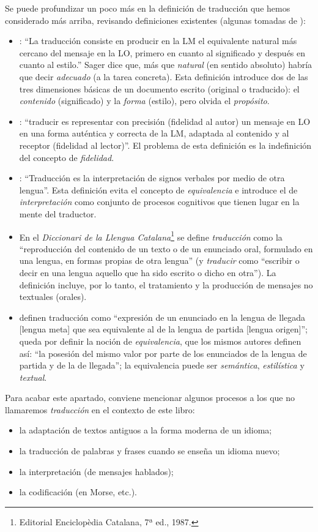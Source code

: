 Se puede profundizar un poco más en la definición de traducción que hemos considerado más arriba, revisando definiciones existentes (algunas tomadas de \citealt{sager93b}): \begin{itemize} \item \citet[p.~19]{nida59b}: ``La traducción consiste en producir en la LM el equivalente natural más cercano del mensaje en la LO, primero en cuanto al significado y después en cuanto al estilo.'' Sager dice que, más que \emph{natural} (en sentido absoluto) habría que decir \emph{adecuado} (a la tarea concreta). Esta definición introduce dos de las tres dimensiones básicas de un documento escrito (original o traducido): el \emph{contenido} (significado) y la \emph{forma} (estilo), pero olvida el \emph{propósito}. \item \citet{flamand83b}: ``traducir es representar con precisión (fidelidad al autor) un mensaje en LO en una forma auténtica y correcta de la LM, adaptada al contenido y al receptor (fidelidad al lector)''. El problema de esta definición es la indefinición del concepto de \emph{fidelidad}. \item \citet{jakobson66b}: ``Traducción es la interpretación de signos verbales por medio de otra lengua''. Esta definición evita el concepto de \emph{equivalencia} e introduce el de \emph{interpretación} como conjunto de procesos cognitivos que tienen lugar en la mente del traductor. \item En el \emph{Diccionari de la Llengua Catalana}\footnote{Editorial Enciclopèdia Catalana, 7ª ed., 1987.} se define {\em traducción} como la ``reproducción del contenido de un texto o de un enunciado oral, formulado en una lengua, en formas propias de otra lengua'' (y \emph{traducir} como ``escribir o decir en una lengua aquello que ha sido escrito o dicho en otra''). La definición incluye, por lo tanto, el tratamiento y la producción de mensajes no textuales (orales). \item \citet{alcaraz97b} definen traducción como ``expresión de un enunciado en la lengua de llegada [lengua meta] que sea equivalente al de la lengua de partida [lengua origen]''; queda por definir la noción de \emph{equivalencia}, que los mismos autores definen así: ``la posesión del mismo valor por parte de los enunciados de la lengua de partida y de la de llegada''; la equivalencia puede ser {\em semántica}, \emph{estilística} y \emph{textual}. \end{itemize} 

Para acabar este apartado, conviene mencionar algunos procesos a los que no llamaremos \emph{traducción} en el contexto de este libro: \begin{itemize} \item la adaptación de textos antiguos a la forma moderna de un idioma; \item la traducción de palabras y frases cuando se enseña un idioma nuevo; \item la interpretación (de mensajes hablados); \item la codificación (en Morse, etc.). \end{itemize} 

